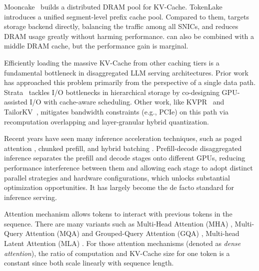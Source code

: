 Mooncake~\cite{FAST25:Mooncake} builds a distributed DRAM pool for KV-Cache.
TokenLake~\cite{TokenLake} introduces a unified segment-level prefix cache pool.
Compared to them, \sysname targets storage backend directly, balancing the traffic among all SNICs, and reduces DRAM usage greatly without harming performance.
\sysname can also be combined with a middle DRAM cache, but the performance gain is marginal. 

Efficiently loading the massive KV-Cache from other caching tiers is a fundamental bottleneck in disaggregated LLM serving architectures.
Prior work has approached this problem primarily from the perspective of a single data path.
Strata~\cite{Strata} tackles I/O bottlenecks in hierarchical storage by co-designing GPU-assisted I/O with cache-aware scheduling.
Other work, like KVPR~\cite{ACL25:KVPR} and TailorKV~\cite{ACL25:TailorKV}, mitigates bandwidth constraints (e.g., PCIe) on this path via recomputation overlapping and layer-granular hybrid quantization. 

Recent years have seen many inference acceleration techniques, such as paged attention \cite{SOSP23:PagedAttention}, chunked prefill, and hybrid batching \cite{OSDI24:SarathiServe,FastGen}. Prefill-decode disaggregated inference \cite{ISCA24:Splitwise,OSDI24:DistServe} separates the prefill and decode stages onto different GPUs, reducing performance interference between them and allowing each stage to adopt distinct parallel strategies and hardware configurations, which unlocks substantial optimization opportunities. It has largely become the de facto standard for inference serving.

Attention mechanism allows tokens to interact with previous tokens in the sequence. 
There are many variants such as Multi-Head Attention (MHA) \cite{NIPS17:Transformer}, Multi-Query Attention (MQA) \cite{MQA} and Grouped-Query Attention (GQA) \cite{EMNLP23:GQA}, Multi-head Latent Attention (MLA) \cite{DeepSeekV2}.
For those attention mechanisms (denoted as \emph{dense attention}), the ratio of computation and KV-Cache size for one token is a constant since both scale linearly with sequence length. 

